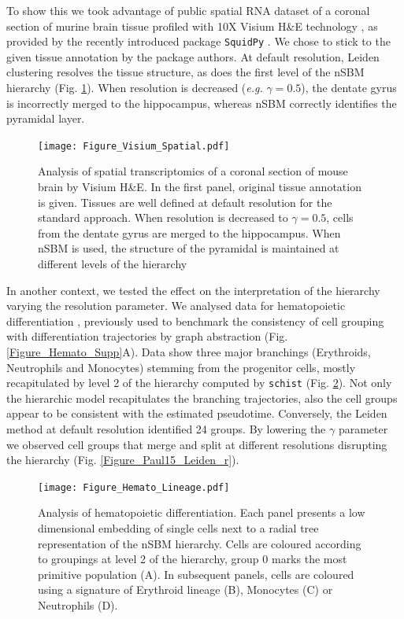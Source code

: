 \documentclass[10pt]{article}
\begin{document}
To show this we took advantage of public spatial RNA dataset of a coronal section of murine brain tissue profiled with 10X Visium H\&E technology \cite{Gracia_Villacampa_2020}, as provided by the recently introduced package \texttt{SquidPy} \cite{Palla_Theis_2021}. We chose to stick to the given tissue annotation by the package authors. At default resolution, Leiden clustering resolves the tissue structure, as does the first level of the nSBM hierarchy (Fig. \ref{Figure_Visium}). When resolution is decreased (\emph{e.g.} $\gamma = 0.5$), the dentate gyrus is incorrectly merged to the hippocampus, whereas nSBM correctly identifies the pyramidal layer. 

\begin{figure}[H]
\centering
\texttt{[image: Figure\_Visium\_Spatial.pdf]}
\vspace*{-80pt}
\caption[]{Analysis of spatial transcriptomics of a coronal section of mouse brain by Visium H\&E. In the first panel, original tissue annotation is given. Tissues are well defined at default resolution for the standard approach. When resolution is decreased to $\gamma = 0.5$, cells from the dentate gyrus are merged to the hippocampus. When nSBM is used, the structure of the pyramidal is maintained at different levels of the hierarchy}\label{Figure_Visium}
\end{figure}

In another context, we tested the effect on the interpretation of the hierarchy varying the resolution parameter. We analysed data for hematopoietic differentiation \cite{paul_2015}, previously used to benchmark the consistency of cell grouping with differentiation trajectories by graph abstraction \cite{wolf_2019} (Fig. \ref{Figure_Hemato_Supp}A). Data show three major branchings (Erythroids, Neutrophils and Monocytes) stemming from the progenitor cells, mostly recapitulated by level 2 of the hierarchy computed by \texttt{schist} (Fig. \ref{Figure_Hemato_Lineage}). Not only the hierarchic model recapitulates the branching trajectories, also the cell groups appear to be consistent with the estimated pseudotime. Conversely, the Leiden method at default resolution identified 24 groups. By lowering the $\gamma$ parameter we observed cell groups that merge and split at different resolutions disrupting the hierarchy (Fig. \ref{Figure_Paul15_Leiden_r}). 


\begin{figure}[H]
\centering
\texttt{[image: Figure\_Hemato\_Lineage.pdf]}
\caption[]{Analysis of hematopoietic differentiation. Each panel presents a low dimensional embedding of single cells next to a radial tree representation of the nSBM hierarchy. Cells are coloured according to groupings at level 2 of the hierarchy, group 0 marks the most primitive population (A). In subsequent panels, cells are coloured using a signature of Erythroid lineage (B), Monocytes (C) or Neutrophils (D).}\label{Figure_Hemato_Lineage}
\end{figure}
\end{document}
